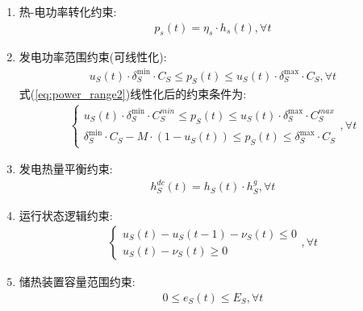 \documentclass{article}
\begin{document}
\begin{enumerate}
{\begin{enumerate}
{\begin{align}
\begin{cases}
                        \bar{h}_S^{dc}=C_B\eta_m \eta_S
                    \end{cases},\forall t
                \end{align}
            }
            \item {热-电功率转化约束:
                \begin{align}
                    p_s(t)=\eta_s\cdot h_s(t),\forall t
                \end{align}
            }
            \item {发电功率范围约束({\color{red}可线性化}):
                \begin{align}
                    u_{S}(t)\cdot\delta_{S}^{\min}\cdot C_{S}\leq p_{S}(t)\leq u_{S}(t)\cdot\delta_{S}^{\max}\cdot C_{S},\forall t \label{eq:power_range2}
                \end{align}
                式(\ref{eq:power_range2})线性化后的约束条件为:
                \begin{align}
                    \begin{cases}
                        u_{S}(t)\cdot\delta_{S}^{\min}\cdot C_{S}^{min}\leq p_{S}(t)\leq u_{S}(t)\cdot\delta_{S}^{\max}\cdot C_{S}^{max}\\
                        \delta_{S}^{\min}\cdot C_{S} - M \cdot (1-u_{S}(t)) \leq p_{S}(t)\leq \delta_{S}^{\max}\cdot C_{S}
                    \end{cases},\forall t
                \end{align}
            }
            \item {发电热量平衡约束:
                \begin{align}
                    h_S^{dc}(t)=h_S(t)\cdot h_S^g,\forall t
                \end{align}
            }
            \item {运行状态逻辑约束:
                \begin{align}
                    \begin{cases}u_S(t)-u_S(t-1)-\nu_S(t)\leq0\\u_S(t)-\nu_S(t)\geq0\end{cases},\forall t
                \end{align}
            }
            \item {储热装置容量范围约束:
                \begin{align}
                    0\leq e_S(t)\leq E_S,\forall t
                \end{align}
            }

\end{enumerate}}
\end{enumerate}
\end{document}

